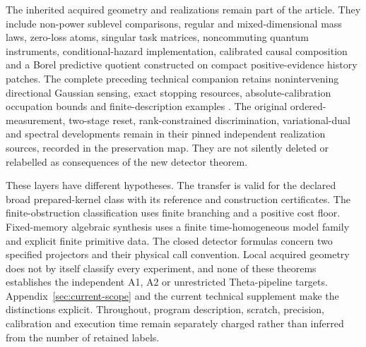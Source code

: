 The inherited acquired geometry and realizations remain part of the article. They include non-power sublevel comparisons, regular and mixed-dimensional mass laws, zero-loss atoms, singular task matrices, noncommuting quantum instruments, conditional-hazard implementation, calibrated causal composition and a Borel predictive quotient constructed on compact positive-evidence history patches. The complete preceding technical companion retains nonintervening directional Gaussian sensing, exact stopping resources, absolute-calibration occupation bounds and finite-description examples \cite{Companion}. The original ordered-measurement, two-stage reset, rank-constrained discrimination, variational-dual and spectral developments remain in their pinned independent realization sources, recorded in the preservation map. They are not silently deleted or relabelled as consequences of the new detector theorem.

These layers have different hypotheses. The transfer is valid for the declared broad prepared-kernel class with its reference and construction certificates. The finite-obstruction classification uses finite branching and a positive cost floor. Fixed-memory algebraic synthesis uses a finite time-homogeneous model family and explicit finite primitive data. The closed detector formulas concern two specified projectors and their physical call convention. Local acquired geometry does not by itself classify every experiment, and none of these theorems establishes the independent A1, A2 or unrestricted Theta-pipeline targets. Appendix~\ref{sec:current-scope} and the current technical supplement make the distinctions explicit. Throughout, program description, scratch, precision, calibration and execution time remain separately charged rather than inferred from the number of retained labels.
